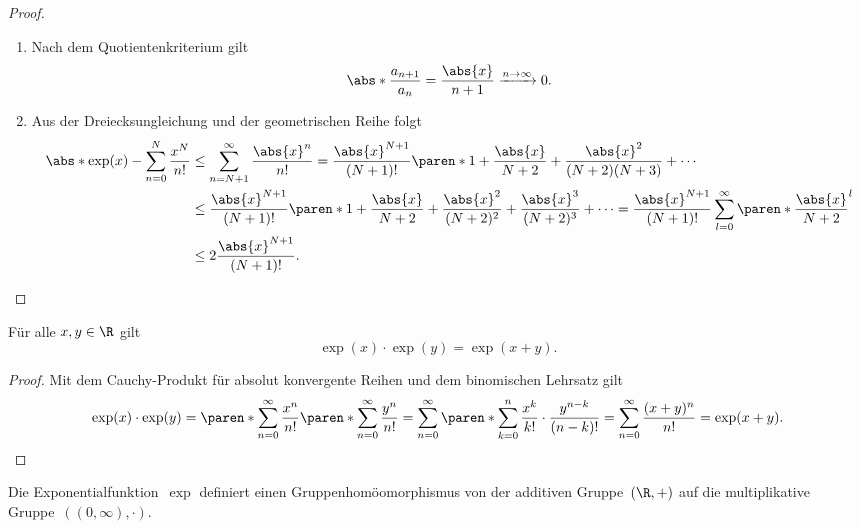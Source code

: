 \documentclass[a4paper]{article}
\begin{document}
\begin{proof}\leavevmode
    \begin{enumerate}
        \item Nach dem Quotientenkriterium gilt
              \begin{equation*}
                  \abs*{\frac{a_{n+1}}{a_n}} = \frac{\abs{x}}{n+1} \xrightarrow{n\to\infty} 0.
              \end{equation*}
        \item Aus der Dreiecksungleichung und der geometrischen Reihe folgt
              \begin{align*}
                  \abs*{\exp(x) - \sum_{n=0}^N \frac{x^N}{n!}} & \leq \sum_{n=N+1}^\infty \frac{\abs{x}^n}{n!} = \frac{\abs{x}^{N+1}}{(N+1)!} \paren*{1 + \frac{\abs{x}}{N+2} + \frac{\abs{x}^2}{(N+2)(N+3)} + \cdots}                                                               \\
                                                               & \leq \frac{\abs{x}^{N+1}}{(N+1)!} \paren*{1 + \frac{\abs{x}}{N+2} + \frac{\abs{x}^2}{(N+2)^2} + \frac{\abs{x}^3}{(N+2)^3} + \cdots} = \frac{\abs{x}^{N+1}}{(N+1)!} \sum_{l=0}^\infty \paren*{\frac{\abs{x}}{N+2}}^l \\
                                                               & \leq 2\frac{\abs{x}^{N+1}}{(N+1)!}. \qedhere
              \end{align*}
    \end{enumerate}
\end{proof}

\begin{theorem}[Funktionalgleichung]
    Für alle $x,y \in \R$ gilt
    \begin{equation*}
        \exp(x) \cdot \exp(y) = \exp(x+y).
    \end{equation*}
\end{theorem}

\begin{proof}
    Mit dem Cauchy-Produkt für absolut konvergente Reihen und dem binomischen Lehrsatz gilt
    \begin{equation*}
        \exp(x) \cdot \exp(y) = \paren*{\sum_{n=0}^\infty \frac{x^n}{n!}} \paren*{\sum_{n=0}^\infty \frac{y^n}{n!}} = \sum_{n=0}^\infty \paren*{\sum_{k=0}^n \frac{x^k}{k!} \cdot \frac{y^{n-k}}{(n-k)!}} = \sum_{n=0}^\infty \frac{(x+y)^n}{n!} = \exp(x+y). \qedhere
    \end{equation*}
\end{proof}

\begin{remark}
    Die Exponentialfunktion~$\exp$ definiert einen Gruppenhomöomorphismus von der additiven Gruppe~$(\R,+)$ auf die multiplikative Gruppe~$((0,\infty),\cdot)$.
\end{remark}
\end{document}
